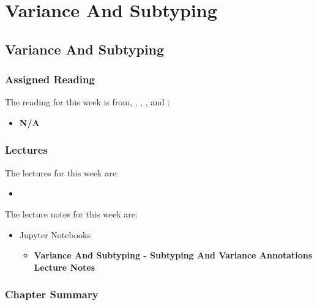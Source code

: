 \clearpage

\renewcommand{\ChapTitle}{Variance And Subtyping}
\renewcommand{\SectionTitle}{Variance And Subtyping}

\chapter{\ChapTitle}

\section{\SectionTitle}

\subsection{Assigned Reading}

The reading for this week is from, \AtomicScalaBook, \EssOfPPLBook, \FuncOfPPLBook, and \ProgInScalaBook:

\begin{itemize}
    \item \textbf{N/A}
\end{itemize}

\subsection{Lectures}

The lectures for this week are:

\begin{itemize}
    \item {}
\end{itemize}

\noindent The lecture notes for this week are:

\begin{itemize}
    \item Jupyter Notebooks
    \begin{itemize}
        \item \textbf{Variance And Subtyping - Subtyping And Variance Annotations Lecture Notes}
    \end{itemize}
\end{itemize}

\subsection{Chapter Summary}

